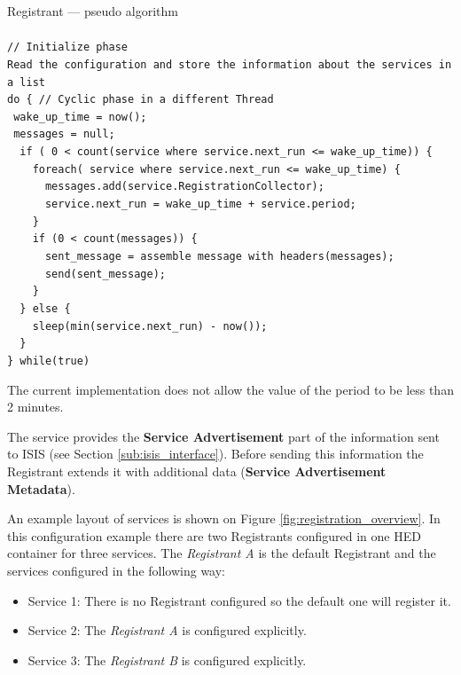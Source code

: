 \documentclass{book}
\begin{document}
\begin{framed}
  Registrant --- pseudo algorithm\\
  \\
  \verb#// Initialize phase#\\
  \verb#Read the configuration and store the information about the services in a list#\\
  \verb#do { // Cyclic phase in a different Thread#\\
  \verb# wake_up_time = now();#\\
  \verb# messages = null;#\\
  \verb#  if ( 0 < count(service where service.next_run <= wake_up_time)) {#\\
  \verb#    foreach( service where service.next_run <= wake_up_time) {#\\
  \verb#      messages.add(service.RegistrationCollector);#\\
  \verb#      service.next_run = wake_up_time + service.period;#\\
  \verb#    }#\\
  \verb#    if (0 < count(messages)) {#\\
  \verb#      sent_message = assemble message with headers(messages);#\\
  \verb#      send(sent_message);#\\
  \verb#    }#\\
  \verb#  } else {#\\
  \verb#    sleep(min(service.next_run) - now()); #\\
  \verb#  }#\\
  \verb#} while(true)#\\
\end{framed}
The current implementation does not allow the value of the period to be less than 2 minutes.

The service provides the \textbf{Service Advertisement} part of the information sent to ISIS (see Section \ref{sub:isis_interface}).
Before sending this information the Registrant extends it with additional data (\textbf{Service Advertisement Metadata}).

An example layout of services is shown on Figure \ref{fig:registration_overview}. In this configuration example 
there are two Registrants configured in one HED container for three services. The \textit{Registrant A} is the 
default Registrant and the services configured in the following way:

\begin{itemize}
  \item Service 1: There is no Registrant configured so the default one will register it.
  \item Service 2: The \textit{Registrant A} is configured explicitly.
  \item Service 3: The \textit{Registrant B} is configured explicitly.
\end{itemize}
\end{document}
